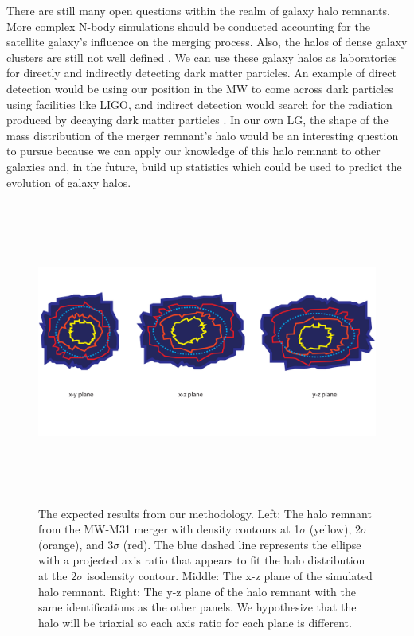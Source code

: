\documentclass[linenumbers, twocolumn]{aastex631}
\begin{document}
There are still many open questions within the realm of galaxy halo remnants.
More complex N-body simulations should be conducted accounting for the satellite galaxy's influence on the merging process. Also, the halos of dense galaxy clusters are still not well defined \citep{2019drakos}.
We can use these galaxy halos as laboratories for directly and indirectly detecting dark matter particles. An example of direct detection would be using our position in the MW to come across dark particles using facilities like LIGO, and indirect detection would search for the radiation produced by decaying dark matter particles \citep{2012Frenk_White}. In our own LG, the shape of the mass distribution of the merger remnant's halo would be an interesting question to pursue because we can apply our knowledge of this halo remnant to other galaxies and, in the future, build up statistics which could be used to predict the evolution of galaxy halos.

\begin{figure}
    \centering
    \includegraphics[width=\textwidth,height=10cm]{ASTR400B_proposal_diagram_2.pdf}
    \caption{The expected results from our methodology. Left: The halo remnant from the MW-M31 merger with density contours at 1$\sigma$ (yellow), 2$\sigma$ (orange), and 3$\sigma$ (red). The blue dashed line represents the ellipse with a projected axis ratio that appears to fit the halo distribution at the 2$\sigma$ isodensity contour. Middle: The x-z plane of the simulated halo remnant. Right: The y-z plane of the halo remnant with the same identifications as the other panels. We hypothesize that the halo will be triaxial so each axis ratio for each plane is different.}
    \label{fig:method_fig}
\end{figure}
\end{document}
